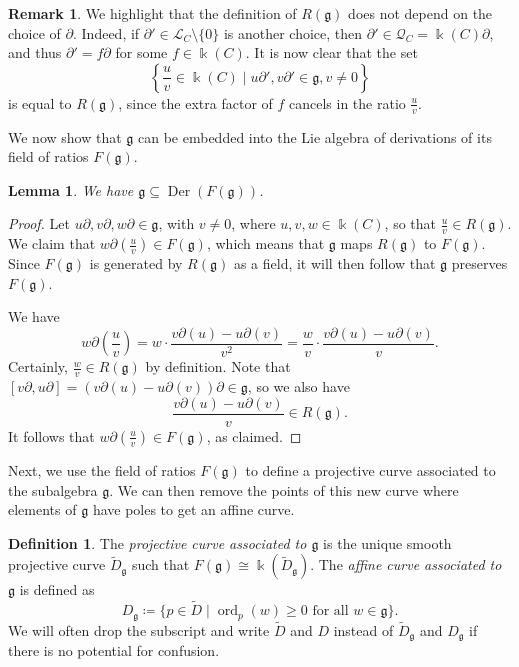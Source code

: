 \documentclass[12pt]{amsart}
\theoremstyle{plain}
\newtheorem{lemma}[theorem]{Lemma}
\theoremstyle{definition}
\newtheorem{definition}[theorem]{Definition}
\newtheorem{remark}[theorem]{Remark}
\numberwithin{equation}{section}
\def\g{\mathfrak{g}}
\def\L{\mathcal{L}}
\def\Q{\mathcal{Q}}
\def\kk{\Bbbk}
\DeclareMathOperator{\Der}{Der}
\DeclareMathOperator{\ord}{ord}
\def\del{\partial}
\def\nonzero{\setminus \{0\}}
\begin{document}
\begin{remark}
    We highlight that the definition of $R(\g)$ does not depend on the choice of $\del$. Indeed, if $\del' \in \L_C \nonzero$ is another choice, then $\del' \in \Q_C = \kk(C)\del$, and thus $\del' = f\del$ for some $f \in \kk(C)$. It is now clear that the set
    $$\left\{\frac{u}{v} \in \kk(C) \mid u\del', v\del' \in \g, v \neq 0\right\}$$
    is equal to $R(\g)$, since the extra factor of $f$ cancels in the ratio $\frac{u}{v}$.
\end{remark}

We now show that $\g$ can be embedded into the Lie algebra of derivations of its field of ratios $F(\g)$.

\begin{lemma}\label{lem:g acts on F(g)}
    We have $\g \subseteq \Der(F(\g))$.
\end{lemma}
\begin{proof}
    Let $u\del,v\del,w\del \in \g$, with $v \neq 0$, where $u,v,w \in \kk(C)$, so that $\frac{u}{v} \in R(\g)$. We claim that $w\del(\frac{u}{v}) \in F(\g)$, which means that $\g$ maps $R(\g)$ to $F(\g)$. Since $F(\g)$ is generated by $R(\g)$ as a field, it will then follow that $\g$ preserves $F(\g)$.

    We have
    $$w\del\left(\frac{u}{v}\right) = w \cdot \frac{v\del(u) - u\del(v)}{v^2} = \frac{w}{v} \cdot \frac{v\del(u) - u\del(v)}{v}.$$
    Certainly, $\frac{w}{v} \in R(\g)$ by definition. Note that $[v\del,u\del] = (v\del(u) - u\del(v))\del \in \g$, so we also have
    $$\frac{v\del(u) - u\del(v)}{v} \in R(\g).$$
    It follows that $w\del(\frac{u}{v}) \in F(\g)$, as claimed.
\end{proof}

Next, we use the field of ratios $F(\g)$ to define a projective curve associated to the subalgebra $\g$. We can then remove the points of this new curve where elements of $\g$ have poles to get an affine curve.

\begin{definition}\label{def:curves associated to g}
    The \emph{projective curve associated to $\g$} is the unique smooth projective curve $\widetilde{D}_\g$ such that $F(\g) \cong \kk(\widetilde{D}_\g)$. The \emph{affine curve associated to $\g$} is defined as
    $$D_\g \coloneqq \{p \in \widetilde{D} \mid \ord_p(w) \geq 0 \text{ for all } w \in \g\}.$$
    We will often drop the subscript and write $\widetilde{D}$ and $D$ instead of $\widetilde{D}_\g$ and $D_\g$ if there is no potential for confusion.
\end{definition}
\end{document}
